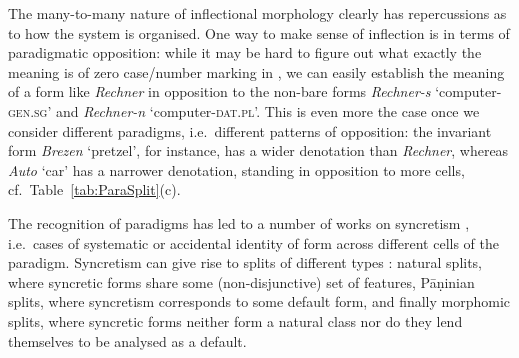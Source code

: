 \documentclass[output=paper,biblatex,babelshorthands,newtxmath,draftmode,colorlinks,citecolor=brown]{langscibook}
\begin{document}
The many-to-many nature of inflectional morphology clearly has
repercussions as to how the system is organised.  One way to make
sense of inflection is in terms of paradigmatic opposition: while it
may be hard to figure out what exactly the meaning is of zero
case/number marking in , we can easily establish the meaning of
a form like \textit{Rechner} in opposition to the non-bare forms
\textit{Rechner-s} `computer-\textsc{gen.sg}' and \textit{Rechner-n}
`computer-\textsc{dat.pl}'. This is even more the case once we
consider different paradigms, i.e.\ different patterns of opposition:
the invariant form \textit{Brezen} `pretzel', for instance, has a wider
denotation than \textit{Rechner}, whereas \textit{Auto}
`car' has a narrower denotation,  standing in
opposition to more cells, cf.\ Table~\ref{tab:ParaSplit}(c).    

The recognition of paradigms has led to a number of works on
syncretism \citep[see, e.g.][]{Baerman05}, i.e.\ cases of systematic or
accidental identity of form across different cells of the
paradigm. Syncretism can give rise to splits of different types
\citep{Corbett15}: natural splits, where syncretic forms share some
(non-disjunctive) set of features, Pāṇinian splits, where syncretism
corresponds to some default form, and finally morphomic splits, where
syncretic forms neither form a natural class nor do they lend
themselves to be analysed as a default. 
\end{document}
